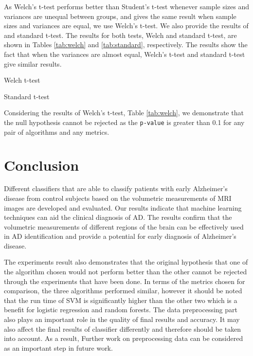 As Welch's t-test performs better than Student's t-test whenever sample sizes and variances are unequal between groups, and gives the same result when sample sizes and variances are equal, we use Welch's t-test. We also provide the results of and standard t-test. The results for both tests, Welch and standard t-test, are shown in Tables \ref{tab:welch} and \ref{tab:standard}, respectively. The results show the fact that when the variances are almost equal, Welch's t-test and standard t-test give similar results.

\begin{table}
	\centering
	\caption{Welch t-test}
	\label{tab:welch}
\end{table}

\begin{table}
	\centering
	\caption{Standard t-test}
	\label{tab:standard}
\end{table}

Considering the results of Welch's t-test, Table \ref{tab:welch}, we demonstrate that the null hypothesis cannot be rejected as the \texttt{p-value} is greater than 0.1 for any pair of algorithms and any metrics.

\section{Conclusion}

Different classifiers that are able to classify patients with early Alzheimer’s disease from control subjects based on the volumetric measurements of MRI images are developed and evaluated. Our results indicate that machine learning techniques can aid the clinical diagnosis of AD. The results confirm that the volumetric measurements of different regions of the brain can be effectively used in AD identification and provide a potential for early diagnosis of Alzheimer’s disease. 

The experiments result also demonstrates that the original hypothesis that one of the algorithm chosen would not perform better than the other cannot be rejected through the experiments that have been done. In terms of the metrics chosen for comparison, the three algorithms performed similar, however it should be noted that the run time of SVM is significantly higher than the other two which is a benefit for logistic regression and random forests. The data preprocessing part also plays an important role in the quality of final results and accuracy. It may also affect the final results of classifier differently and therefore should be taken into account. As a result, Further work on preprocessing data can be considered as an important step in future work.

